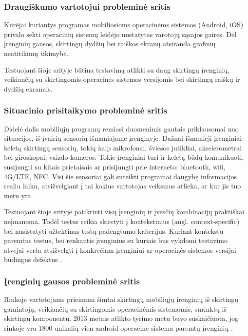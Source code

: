 \documentclass{VUMIFPSkursinis}
\begin{document}
\subsubsection{Draugiškumo vartotojui probleminė sritis}
Kūrėjai kuriantys programas mobiliosioms operacinėms sistemos (Android, iOS) privalo sekti operacinių sistemų leidėjo nustatytas varotojų sąsajos gaires. Dėl įrenginių gausos, skirtingų dydžių bei raiškos ekranų atsiranda grafinių neatitikimų tikimybė. 

Testuojant šioje srityje būtina testavimą atlikti su daug skirtingų įrenginių, veikiančių su skirtingomis operacinės sistemos versijomis bei skirtingų raiškų ir dydžių ekranais.

\subsubsection{Situacinio prisitaikymo probleminė sritis}
Didelė dalis mobiliųjų programų remiasi duomenimis gautais priklausomai nuo situacijos, iš įvairių sensorių išmaniajame įrenginyje. Dažnai išmanieji įrenginiai keletą skirtingų sensorių, tokių kaip mikrofonai, šviesos jutikliai, akselerometrai bei giroskopai, vaizdo kameros. Tokie įrenginiai turi ir keletą būdų komunikuoti, susijungti su kitais prietaisais ar prisijungti prie interneto: bluetooth, wifi, 4G/LTE, NFC. Visi šie sensoriai gali suteikti programai daugybę informacijos realiu laiku, atsižvelgiant į tai kokius vartotojas veiksmus atlieka, ar kur jis tuo metu yra.

Testuojant šioje srityje patikrinti visų įrenginių ir įvesčių kombinacijų praktiškai neįmanoma. Todėl testus reikia skirstyti į kontekstinius (angl. context-specific) bei nusistatyti užtektinus testų padengtumo kriterijus. Kuriant kontekstu paremtus testus, bei renkantis įrenginius su kuriais bus vykdomi testavimo atvejai verta atsižvelgti į konkrečiam įrenginiui ar operacinės sistemos versijai būdingus defektus \cite{android_bugs}.

\subsubsection{Įrenginių gausos probleminė sritis}
Rinkoje vartotojams prieinami šimtai skirtingų mobiliųjų įrenginių iš skirtingų gamintojų, veikiančių su skirtingomis operacinėmis sistemomis, surinktų iš skirtingų komponentų. 2013 metais atlikto tyrimo metu buvo suskaičiuota, jog rinkoje yra 1800 unikalių vien android operacine sistema paremtų įrenginių \cite{Muccini:2012:STM:2663608.2663615}.
\end{document}
